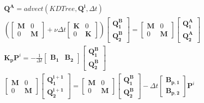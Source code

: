 \documentclass[12pt]{report}
\newcommand{\vecf}[1]{\mathbf{#1}}
\begin{document}
\begin{align}
	&\mathbf{Q^A} = advect(KDTree, \mathbf{Q^{i}}, \Delta t) \label{eq:adv-diff-split-advect}\\
		&\left(\begin{bmatrix}
		\mathbf{M} & 0 \\
		0 & \mathbf{M}
	\end{bmatrix} + \nu\Delta t\begin{bmatrix}
		\mathbf{K} & 0 \\
		0 & \mathbf{K}
	\end{bmatrix}\right)\begin{bmatrix}
		\vecf{Q^{B}_1} \\
		\vecf{Q^{B}_2}
	\end{bmatrix} = \begin{bmatrix}
		\mathbf{M} & 0 \\
		0 & \mathbf{M}
	\end{bmatrix}\begin{bmatrix}
		\vecf{Q^{A}_1} \\
		\vecf{Q^{A}_2}
	\end{bmatrix} \label{eq:adv-diff-split-diffuse}\\
	&\mathbf{K_p}\vecf{P}^i = -\frac{1}{\Delta t} \begin{bmatrix}
		\mathbf{B_1} & \mathbf{B_2}
	\end{bmatrix} \begin{bmatrix}
		\vecf{Q^{B}_1} \\
		\vecf{Q^{B}_2}
	\end{bmatrix} \label{eq:adv-diff-split-pressure}\\
	&\begin{bmatrix}
		\mathbf{M} & 0 \\
		0 & \mathbf{M}
	\end{bmatrix} \begin{bmatrix}
		\vecf{Q^{i+1}_1} \\
		\vecf{Q^{i+1}_2}
	\end{bmatrix} =	\begin{bmatrix}
		\mathbf{M} & 0 \\
		0 & \mathbf{M}
	\end{bmatrix} \begin{bmatrix}
		\vecf{Q^{B}_1} \\
		\vecf{Q^{B}_2}
	\end{bmatrix} - \Delta t \begin{bmatrix}
		\vecf{B_{p,1}} \\
		\vecf{B_{p,2}}
	\end{bmatrix} \vecf{P}^i \label{eq:adv-diff-split-velicity-mass}
\end{align}
\end{document}
